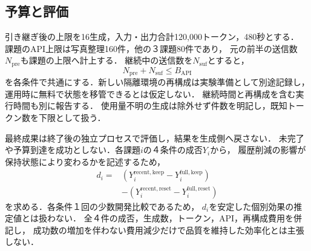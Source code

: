 \subsection{予算と評価}
引き継ぎ後の上限を16生成，入力・出力合計120,000トークン，480秒とする．
課題のAPI上限は写真整理160件，他の３課題80件であり，
元の前半の送信数$N_{\mathrm{pre}}$も課題の上限へ計上する．
継続中の送信数を$N_{\mathrm{suf}}$とすると，
\begin{equation}
 N_{\mathrm{pre}}+N_{\mathrm{suf}}\leq B_{\mathrm{API}}
\end{equation}
を各条件で共通にする．新しい隔離環境の再構成は実験準備として別途記録し，
運用時に無料で状態を移管できるとは仮定しない．
継続時間と再構成を含む実行時間も別に報告する．
使用量不明の生成は除外せず件数を明記し，既知トークン数を下限として扱う．

最終成果は終了後の独立プロセスで評価し，結果を生成側へ戻さない．
未完了や予算到達を成功としない．各課題$i$の４条件の成否$Y_i$から，
履歴削減の影響が保持状態により変わるかを記述するため，
\begin{align}
 d_i={}&(Y_i^{\mathrm{recent,keep}}-Y_i^{\mathrm{full,keep}})\nonumber\\
      &-(Y_i^{\mathrm{recent,reset}}-Y_i^{\mathrm{full,reset}})
\end{align}
を求める．各条件１回の少数開発比較であるため，
$d_i$を安定した個別効果の推定値とは扱わない．
全４件の成否，生成数，トークン，API，再構成費用を併記し，
成功数の増加を伴わない費用減少だけで品質を維持した効率化とは主張しない．
